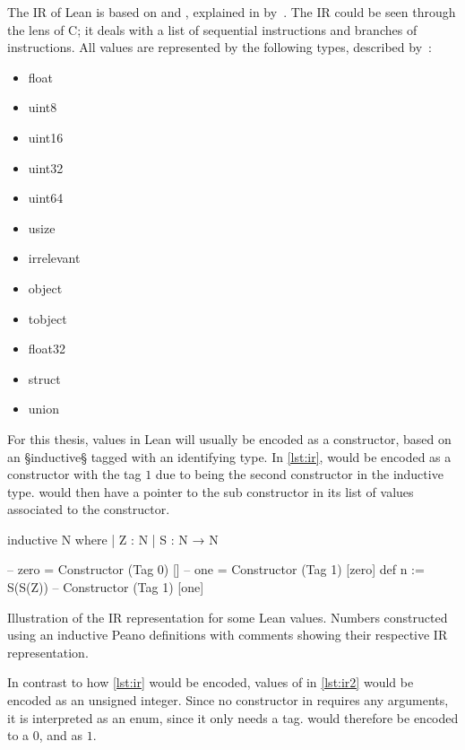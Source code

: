 The IR of Lean is based on  and , explained in  by~\cite{Beans}.
The IR could be seen through the lens of C; it deals with a list of sequential instructions and branches of instructions.
All values are represented by the following types, described by~\cite{IR}:
\vspace{-0.2cm}
\begin{multicols}{4}
\begin{itemize}[noitemsep]
    \item float
    \item uint8
    \item uint16
    \item uint32
    \item uint64
    \item usize
    \item irrelevant
    \item object
    \item tobject
    \item float32
    \item struct
    \item union
\end{itemize}
\end{multicols}
\vspace{-0.2cm}

For this thesis, values in Lean will usually be encoded as a constructor, based on an §inductive§ tagged with an identifying type.
In \cref{lst:ir},  would be encoded as a constructor with the tag $1$ due to being the second constructor in the inductive type.
 would then have a pointer to the sub constructor  in its list of values associated to the constructor.
\begin{listing}[H]
\begin{LeanCode}
inductive N where
  | Z : N
  | S : N → N

-- zero =           Constructor (Tag 0) []
-- one  =           Constructor (Tag 1) [zero]
def n := S(S(Z)) -- Constructor (Tag 1) [one]
\end{LeanCode}
\caption[Illustration of the IR representation for inductive Lean values.]{
  Illustration of the IR representation for some Lean values.
  Numbers constructed using an inductive Peano definitions with comments showing their respective IR representation.
}
\label{lst:ir}
\end{listing}

\vspace{-0.4cm}
In contrast to how \cref{lst:ir} would be encoded, values of  in \cref{lst:ir2} would be encoded as an unsigned integer.
Since no constructor in  requires any arguments, it is interpreted as an enum, since it only needs a tag.
 would therefore be encoded to a $0$, and  as $1$.

